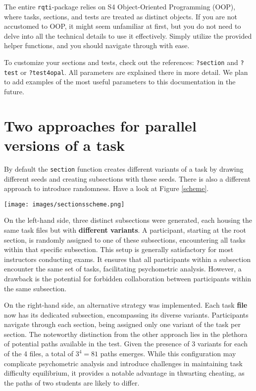 \documentclass[twoside]{tufte-book}
\begin{document}
The entire \texttt{rqti}-package relies on S4 Object-Oriented Programming (OOP), where tasks, sections, and tests are treated as distinct objects. If you are not accustomed to OOP, it might seem unfamiliar at first, but you do not need to delve into all the technical details to use it effectively. Simply utilize the provided helper functions, and you should navigate through with ease.

To customize your sections and tests, check out the references: \texttt{?section} and \texttt{?test} or \texttt{?test4opal}. All parameters are explained there in more detail. We plan to add examples of the most useful parameters to this documentation in the future.

\section{Two approaches for parallel versions of a task}\label{two-approaches-for-parallel-versions-of-a-task}

By default the \texttt{section} function creates different variants of a task by drawing different seeds and creating subsections with these seeds. There is also a different approach to introduce randomness. Have a look at Figure \ref{scheme}.

\begin{figure*}
\centering
\texttt{[image: images/sectionsscheme.png]}
\caption{\label{scheme}Two approaches for structuring parallel versions of tasks}
\end{figure*}

On the left-hand side, three distinct subsections were generated, each housing the same task files but with \textbf{different variants}. A participant, starting at the root section, is randomly assigned to one of these subsections, encountering all tasks within that specific subsection. This setup is generally satisfactory for most instructors conducting exams. It ensures that all participants within a subsection encounter the same set of tasks, facilitating psychometric analysis. However, a drawback is the potential for forbidden collaboration between participants within the same subsection.

On the right-hand side, an alternative strategy was implemented. Each task \textbf{file} now has its dedicated subsection, encompassing its diverse variants. Participants navigate through each section, being assigned only one variant of the task per section. The noteworthy distinction from the other approach lies in the plethora of potential paths available in the test. Given the presence of 3 variants for each of the 4 files, a total of \(3^4 = 81\) paths emerges. While this configuration may complicate psychometric analysis and introduce challenges in maintaining task difficulty equilibrium, it provides a notable advantage in thwarting cheating, as the paths of two students are likely to differ.
\end{document}
